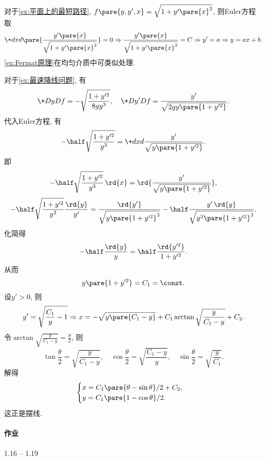 \documentclass[../LectureNotes.tex]{subfiles}
\begin{document}
\begin{sample}
    \begin{ex}
        对于\cref{ex:平面上的最短路径}, $f\pare{y,y',x} = \sqrt{1+y'\pare{x}^2}$, 则Euler方程取
        \[ \+d{x}d{} \pare{\frac{y'\pare{x}}{\sqrt{1+y'\pare{x}^2}}} = 0 \Rightarrow \frac{y'\pare{x}}{\sqrt{1+y'\pare{x}^2}} = C \Rightarrow y' = a \Rightarrow y = ax+b. \]
        \cref{ex:Fermat原理}在均匀介质中可类似处理.
    \end{ex}
\end{sample}
\begin{sample}
    \begin{ex}
        对于\cref{ex:最速降线问题}, 有
        \[ \+DyDf = -\sqrt{\frac{1+y'^2}{8gy^3}},\quad \+D{y'}D{f} = \frac{y'}{\sqrt{2gy\pare{1+y'^2}}}. \]
        代入Euler方程, 有
        \[ -\half \sqrt{\frac{1+y'^2}{y^3}} = \+dxd{} \frac{y'}{\sqrt{y\pare{1+y'^2}}}. \]
        即
        \[ -\half \sqrt{\frac{1+y'^2}{y^3}}\,\rd{x} = \rd{\frac{y'}{\sqrt{y\pare{1+y'^2}}}}, \]
        \[ -\half \sqrt{\frac{1+y'^2}{y^3}}\frac{\rd{y}}{y'} = \frac{\rd{y'}}{\sqrt{y\pare{1+y'^2}^3}} - \half \frac{y'\,\rd{y}}{\sqrt{y^3\pare{1+y'^2}^3}}. \]
        化简得
        \[ -\half \frac{\rd{y}}{y} = \half \frac{\rd{y'^2}}{1+y'^2}. \]
        从而
        \[ y\pare{1+y'^2} = C_1 = \const. \]
        设$y'>0$, 则
        \[ y' = \sqrt{\frac{C_1}{y} - 1}\Rightarrow x = -\sqrt{y\pare{C_1 - y}} + C_1 \arctan \sqrt{\frac{y}{C_1 - y}} + C_2. \]
        令$\displaystyle \arctan \sqrt{\frac{y}{C_1 - y}} = \frac{\theta}{2}$, 则
        \[ \tan \frac{\theta}{2} = \sqrt{\frac{y}{C_1 - y}},\quad  \cos \frac{\theta}{2} = \sqrt{\frac{C_1 - y}{y}},\quad \sin \frac{\theta}{2} = \sqrt{\frac{y}{C_1}}. \]
        解得
        \[ \begin{cases}
            x = C_1 \pare{\theta - \sin \theta}/2 + C_2,\\
            y = C_1\pare{1-\cos\theta}/2.
        \end{cases} \]
        这正是摆线.
    \end{ex}
\end{sample}


\paragraph{作业} %
\label{par:作业}

1.16 -- 1.19


\end{document}
